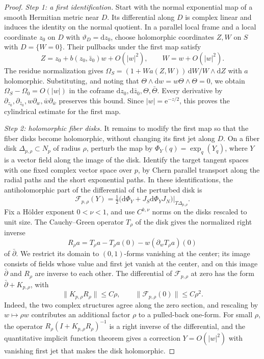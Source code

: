 \begin{proof}
\emph{Step 1: a first identification.} Start with the normal exponential map of a smooth Hermitian metric near $D$. Its differential along $D$ is complex linear and induces the identity on the normal quotient. In a parallel local frame and a local coordinate $z_0$ on $D$ with $\vartheta_D=\mathrm dz_0$, choose holomorphic coordinates $Z,W$ on $S$ with $D=\{W=0\}$. Their pullbacks under the first map satisfy
\[
 Z=z_0+b(z_0,\bar z_0)w+O(|w|^2),\qquad
 W=w+O(|w|^2).
\]
The residue normalization gives $\Omega_S=(1+Wa(Z,W))\,\mathrm dW/W\wedge\mathrm dZ$ with $a$ holomorphic. Substituting, and noting that $\Theta\wedge\mathrm dw=w\Theta\wedge\Theta=0$, we obtain $\Omega_S-\Omega_0=O(|w|)$ in the coframe $\mathrm dz_0,\mathrm d\bar z_0,\Theta,\bar\Theta$. Every derivative by $\partial_{z_0},\partial_{\bar z_0},w\partial_w,\bar w\partial_{\bar w}$ preserves this bound. Since $|w|=\mathrm e^{-z/2}$, this proves the cylindrical estimate for the first map.

\emph{Step 2: holomorphic fiber disks.} It remains to modify the first map so that the fiber disks become holomorphic, without changing its first jet along $D$. On a fiber disk $\Delta_{p,\rho}\subset N_p$ of radius $\rho$, perturb the map by $\Phi_Y(q)=\exp_q(Y_q)$, where $Y$ is a vector field along the image of the disk. Identify the target tangent spaces with one fixed complex vector space over $p$, by Chern parallel transport along the radial paths and the short exponential paths. In these identifications, the antiholomorphic part of the differential of the perturbed disk is
\[
 \mathcal F_{p,\rho}(Y)
 =\tfrac12\bigl(\mathrm d\Phi_Y+J_S\mathrm d\Phi_YJ_N\bigr)
       |_{T\Delta_{p,\rho}}.
\]
Fix a H\"older exponent $0<\nu<1$, and use $C^{k,\nu}$ norms on the disks rescaled to unit size. The Cauchy--Green operator $T_\rho$ of the disk gives the normalized right inverse
\[
 R_\rho a=T_\rho a-T_\rho a(0)
                  -w(\partial_wT_\rho a)(0)
\]
of $\bar\partial$. We restrict its domain to $(0,1)$-forms vanishing at the center; its image consists of fields whose value and first jet vanish at the center, and on this image $\bar\partial$ and $R_\rho$ are inverse to each other. The differential of $\mathcal F_{p,\rho}$ at zero has the form $\bar\partial+K_{p,\rho}$, with
\[
 \|K_{p,\rho}R_\rho\|\leq C\rho,\qquad
 \|\mathcal F_{p,\rho}(0)\|\leq C\rho^2.
\]
Indeed, the two complex structures agree along the zero section, and rescaling by $w\mapsto\rho w$ contributes an additional factor $\rho$ to a pulled-back one-form. For small $\rho$, the operator $R_\rho(I+K_{p,\rho}R_\rho)^{-1}$ is a right inverse of the differential, and the quantitative implicit function theorem gives a correction $Y=O(|w|^2)$ with vanishing first jet that makes the disk holomorphic.


\end{proof}
